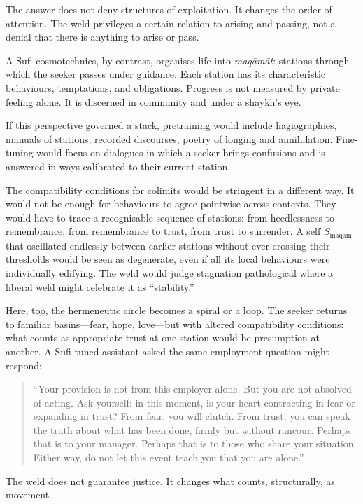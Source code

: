 The answer does not deny structures of exploitation. It changes the order of attention. The weld privileges a certain relation to arising and passing, not a denial that there is anything to arise or pass.

A Sufi cosmotechnics, by contrast, organises life into \emph{maq\=am\=at}: stations through which the seeker passes under guidance. Each station has its characteristic behaviours, temptations, and obligations. Progress is not measured by private feeling alone. It is discerned in community and under a shaykh's eye.

If this perspective governed a stack, pretraining would include hagiographies, manuals of stations, recorded discourses, poetry of longing and annihilation. Fine-tuning would focus on dialogues in which a seeker brings confusions and is answered in ways calibrated to their current station.

The compatibility conditions for colimits would be stringent in a different way. It would not be enough for behaviours to agree pointwise across contexts. They would have to trace a recognisable sequence of stations: from heedlessness to remembrance, from remembrance to trust, from trust to surrender. A self $S_{\text{maq\=am}}$ that oscillated endlessly between earlier stations without ever crossing their thresholds would be seen as degenerate, even if all its local behaviours were individually edifying. The weld would judge stagnation pathological where a liberal weld might celebrate it as ``stability.''

Here, too, the hermeneutic circle becomes a spiral or a loop. The seeker returns to familiar basins---fear, hope, love---but with altered compatibility conditions: what counts as appropriate trust at one station would be presumption at another. A Sufi-tuned assistant asked the same employment question might respond:

\begin{quote}
``Your provision is not from this employer alone. But you are not absolved of acting. Ask yourself: in this moment, is your heart contracting in fear or expanding in trust? From fear, you will clutch. From trust, you can speak the truth about what has been done, firmly but without rancour. Perhaps that is to your manager. Perhaps that is to those who share your situation. Either way, do not let this event teach you that you are alone.''
\end{quote}

The weld does not guarantee justice. It changes what counts, structurally, as movement.


